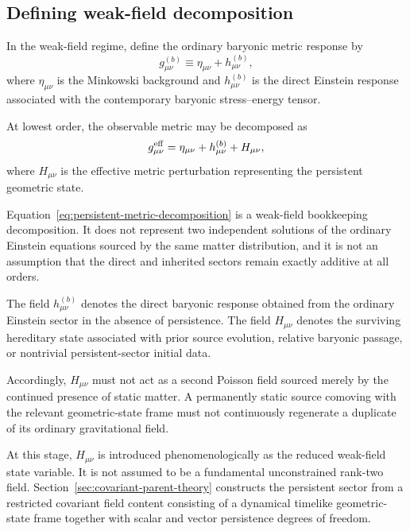 \subsection{Defining weak-field decomposition}
\label{subsec:persistent-state-decomposition}

In the weak-field regime, define the ordinary baryonic metric response by
\begin{equation}
    g_{\mu\nu}^{(b)}
    \equiv
    \eta_{\mu\nu}
    +
    h_{\mu\nu}^{(b)},
    \label{eq:baryonic-metric-background}
\end{equation}
where $\eta_{\mu\nu}$ is the Minkowski background and
$h_{\mu\nu}^{(b)}$ is the direct Einstein response associated with the
contemporary baryonic stress--energy tensor.

At lowest order, the observable metric may be decomposed as
\begin{equation}
    g_{\mu\nu}^{\rm eff}
    =
    \eta_{\mu\nu}
    +
    h_{\mu\nu}^{(b)}
    +
    H_{\mu\nu},
    \label{eq:persistent-metric-decomposition}
\end{equation}
where $H_{\mu\nu}$ is the effective metric perturbation representing the
persistent geometric state.

Equation~\eqref{eq:persistent-metric-decomposition} is a weak-field bookkeeping
decomposition. It does not represent two independent solutions of the ordinary
Einstein equations sourced by the same matter distribution, and it is not an
assumption that the direct and inherited sectors remain exactly additive at all
orders.

The field $h_{\mu\nu}^{(b)}$ denotes the direct baryonic response obtained from
the ordinary Einstein sector in the absence of persistence. The field
$H_{\mu\nu}$ denotes the surviving hereditary state associated with prior source
evolution, relative baryonic passage, or nontrivial persistent-sector initial
data.

Accordingly, $H_{\mu\nu}$ must not act as a second Poisson field sourced merely
by the continued presence of static matter. A permanently static source
comoving with the relevant geometric-state frame must not continuously
regenerate a duplicate of its ordinary gravitational field.

At this stage, $H_{\mu\nu}$ is introduced phenomenologically as the reduced
weak-field state variable. It is not assumed to be a fundamental unconstrained
rank-two field. Section~\ref{sec:covariant-parent-theory} constructs the
persistent sector from a restricted covariant field content consisting of a
dynamical timelike geometric-state frame together with scalar and vector
persistence degrees of freedom.

